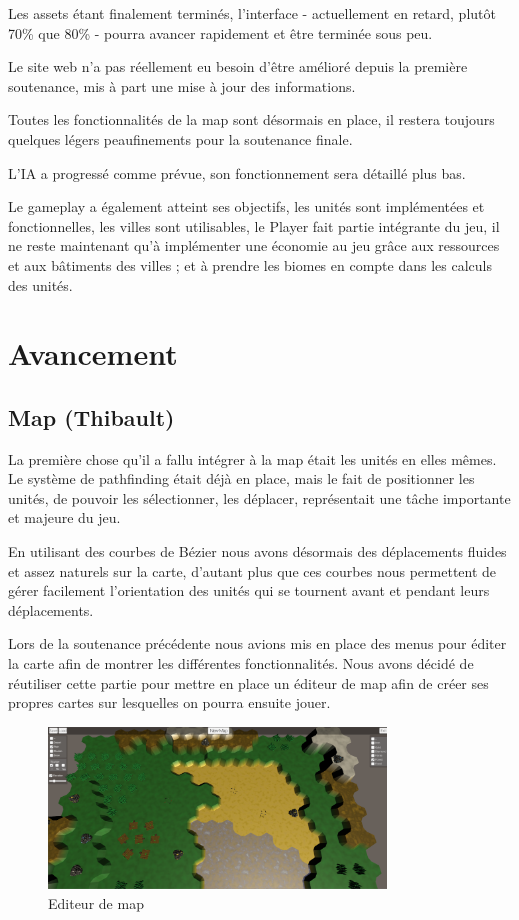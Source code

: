 \documentclass[12pt]{report}
\begin{document}
\vspace{0.5cm}

Les assets étant finalement terminés, l’interface - actuellement en retard,
plutôt 70\% que 80\% - pourra avancer rapidement et être terminée sous peu.

Le site web n’a pas réellement eu besoin d’être amélioré depuis la première
soutenance, mis à part une mise à jour des informations.

Toutes les fonctionnalités de la map sont désormais en place, il restera
toujours quelques légers peaufinements pour la soutenance finale.

L’IA a progressé comme prévue, son fonctionnement sera détaillé plus bas.

Le gameplay a également atteint ses objectifs, les unités sont implémentées et
fonctionnelles, les villes sont utilisables, le Player fait partie intégrante
du jeu, il ne reste maintenant qu’à implémenter une économie au jeu grâce aux
ressources et aux bâtiments des villes ; et à prendre les biomes en compte dans
les calculs des unités.

\chapter{Avancement}

\section{Map (Thibault)}

La première chose qu'il a fallu intégrer à la map était les unités en elles
mêmes. Le système de pathfinding était déjà en place, mais le fait de
positionner les unités, de pouvoir les sélectionner, les déplacer, représentait
une tâche importante et majeure du jeu. 

En utilisant des courbes de Bézier nous avons désormais des déplacements fluides
et assez naturels sur la carte, d'autant plus que ces courbes nous permettent de
gérer facilement l'orientation des unités qui se tournent avant et pendant leurs
déplacements.

Lors de la soutenance précédente nous avions mis en place des menus pour éditer
la carte afin de montrer les différentes fonctionnalités. Nous avons décidé de
réutiliser cette partie pour mettre en place un éditeur de map afin de créer ses
propres cartes sur lesquelles on pourra ensuite jouer.

\begin{figure}[H]
    \centering
    \includegraphics[width=0.8\textwidth]{EditorScreen}
    \caption{Editeur de map}
\end{figure}
\end{document}

